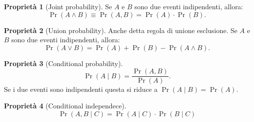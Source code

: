 \documentclass[10pt]{article}
\newcommand{\et}{\wedge}
\newcommand{\orr}{\vee}
\theoremstyle{definition}
\theoremstyle{definition}
\newtheorem{property}{Proprietà}[subsection]
\DeclareMathOperator{\pr}{Pr}
\begin{document}
\begin{property}[Joint probability]
Se $A$ e $B$ sono due eventi indipendenti, allora:
\begin{equation}
\pr(A\et B) \equiv \pr(A, B) = \pr(A) \cdot \pr(B).
\end{equation}
\end{property}

\begin{property}[Union probability]
Anche detta regola di unione esclusione. Se $A$ e $B$ sono due eventi indipendenti, allora:
\begin{equation}
\pr(A\orr B) = \pr(A) + \pr(B) - \pr(A\et B).
\end{equation}
\end{property}

\begin{property}[Conditional probability]
\begin{equation}
\pr(A\mid B) = \frac{\pr(A, B)}{\pr(A)}.
\end{equation}
Se i due eventi sono indipendenti questa si riduce a $\pr(A\mid B) = \pr(A)$.
\end{property}

\begin{property}[Conditional independece]
\begin{equation}
\pr(A, B \mid C) = \pr(A\mid C) \cdot \pr(B\mid C)
\end{equation}
\end{property}
\end{document}

